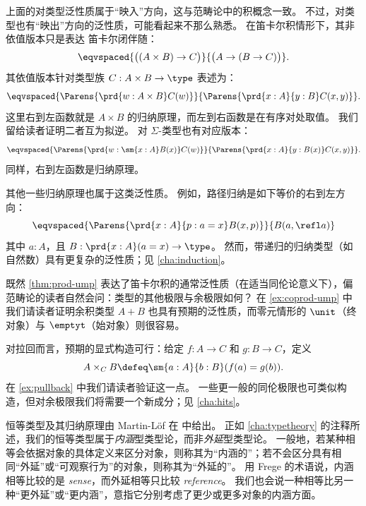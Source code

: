 上面的对类型泛性质属于“映入”方向，这与范畴论中的积概念一致。
不过，对类型也有“映出”方向的泛性质，可能看起来不那么熟悉。
在笛卡尔积情形下，其非依值版本只是表达
笛卡尔闭伴随：
\[ \eqvspaced{\big((A\times B) \to C\big)}{\big(A\to (B\to C)\big)}.\]
其依值版本针对类型族 $C:A\times B\to \type$ 表述为：
\[ \eqvspaced{\Parens{\prd{w:A\times B} C(w)}}{\Parens{\prd{x:A}{y:B} C(x,y)}}. \]
这里右到左函数就是 $A\times B$ 的归纳原理，而左到右函数是在有序对处取值。
我们留给读者证明二者互为拟逆。
对 $\Sigma$-类型也有对应版本：
\begin{equation}
  \eqvspaced{\Parens{\prd{w:\sm{x:A} B(x)} C(w)}}{\Parens{\prd{x:A}{y:B(x)} C(x,y)}}.\label{eq:sigma-lump}
\end{equation}
同样，右到左函数是归纳原理。

其他一些归纳原理也属于这类泛性质。
例如，路径归纳是如下等价的右到左方向：
%
%
\begin{equation}
  \label{eq:path-lump}
  \eqvspaced{\Parens{\prd{x:A}{p:a=x} B(x,p)}}{B(a,\refl a)}
\end{equation}
其中 $a:A$，且 $B:\prd{x:A} (a=x) \to\type$。
然而，带递归的归纳类型（如自然数）具有更复杂的泛性质；见 \cref{cha:induction}。

%
%
%
%
既然 \cref{thm:prod-ump} 表达了笛卡尔积的通常泛性质（在适当同伦论意义下），偏范畴论的读者自然会问：类型的其他极限与余极限如何？
在 \cref{ex:coprod-ump} 中我们请读者证明余积类型 $A+B$ 也具有预期的泛性质，而零元情形的 $\unit$（终对象）与 $\emptyt$（始对象）则很容易。
%
%
%
%

%
对拉回而言，预期的显式构造可行：给定 $f:A\to C$ 和 $g:B\to C$，定义
\begin{equation}
  A\times_C B \defeq \sm{a:A}{b:B} (f(a)=g(b)).\label{eq:defn-pullback}
\end{equation}
在 \cref{ex:pullback} 中我们请读者验证这一点。
一些更一般的同伦极限也可类似构造，但对余极限我们将需要一个新成分；见 \cref{cha:hits}。

%

\sectionNotes

恒等类型及其归纳原理由 Martin-L\"of 在 \cite{Martin-Lof-1973} 中给出。
%
%
%
%
%
正如 \cref{cha:typetheory} 的注释所述，我们的恒等类型属于\emph{内涵}型类型论，而非\emph{外延}型类型论。
一般地，若某种相等会依据对象的具体定义来区分对象，则称其为“内涵的”；若不会区分具有相同“外延”或“可观察行为”的对象，则称其为“外延的”。
用 Frege 的术语说，内涵相等比较的是 \emph{sense}，而外延相等只比较 \emph{reference}。
我们也会说一种相等比另一种“更外延”或“更内涵”，意指它分别考虑了更少或更多对象的内涵方面。

